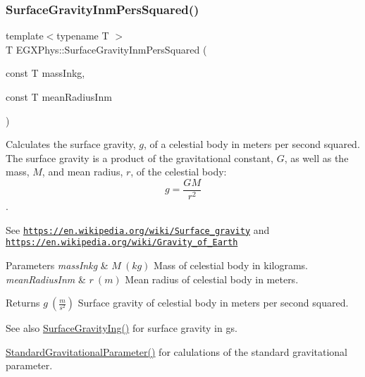 \subsubsection{\texorpdfstring{Surface\+Gravity\+Inm\+Pers\+Squared()}{SurfaceGravityInmPersSquared()}}
{\footnotesize\ttfamily template$<$typename T $>$ \\
T E\+G\+X\+Phys\+::\+Surface\+Gravity\+Inm\+Pers\+Squared (\begin{DoxyParamCaption}\item[{const T}]{mass\+Inkg,  }\item[{const T}]{mean\+Radius\+Inm }\end{DoxyParamCaption})}



Calculates the surface gravity, $g$, of a celestial body in meters per second squared. The surface gravity is a product of the gravitational constant, $G$, as well as the mass, $M$, and mean radius, $r$, of the celestial body\+: \[g = \frac{GM}{r^2}\]. 

See \href{https://en.wikipedia.org/wiki/Surface_gravity}{\tt https\+://en.\+wikipedia.\+org/wiki/\+Surface\+\_\+gravity} and \href{https://en.wikipedia.org/wiki/Gravity_of_Earth}{\tt https\+://en.\+wikipedia.\+org/wiki/\+Gravity\+\_\+of\+\_\+\+Earth}


\begin{DoxyParams}{Parameters}
{\em mass\+Inkg} & $M\ (kg)$ Mass of celestial body in kilograms. \\
\hline
{\em mean\+Radius\+Inm} & $r\ (m)$ Mean radius of celestial body in meters. \\
\hline
\end{DoxyParams}
\begin{DoxyReturn}{Returns}
$g\ (\frac{m}{s^2})$ Surface gravity of celestial body in meters per second squared. 
\end{DoxyReturn}
\begin{DoxySeeAlso}{See also}
\mbox{\hyperlink{group___e_g_x_phys-_astrophysics-_surface_gravity_gab5bb479758d72608ef6ada063f6c1a1b}{Surface\+Gravity\+Ing()}} for surface gravity in gs. 

\mbox{\hyperlink{group___e_g_x_phys-_astrophysics-_standard_gravitational_parameter_ga37f4ed78b0fc23603b49ade3e435ea20}{Standard\+Gravitational\+Parameter()}} for calulations of the standard gravitational parameter. 
\end{DoxySeeAlso}
